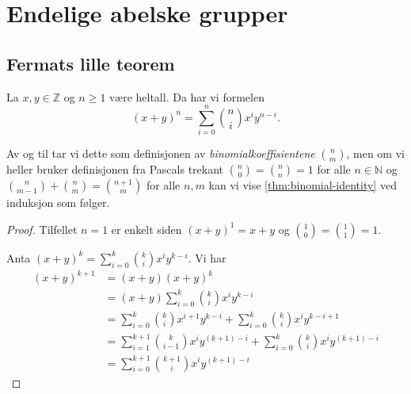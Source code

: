 \section{Endelige abelske grupper}

\subsection{Fermats lille teorem}

\begin{lemma}\label{thm:binomial-identity}
    La $x,y\in \mathbb Z$  og $n \geq 1$ være heltall.
    Da har vi formelen
    \[
        (x + y)^n = \sum_{i = 0}^n \binom n i x^i y^{n - i}.
    \]
\end{lemma}

Av og til tar vi dette som definisjonen av \textit{binomialkoeffisientene}
$\binom n m$,
men om vi heller bruker definisjonen fra Pascals trekant $\binom n 0 = \binom n n = 1$
for alle $n\in\mathbb N$ og $\binom n {m - 1} + \binom n m = \binom {n + 1} m$
for alle $n, m$ kan vi vise \cref{thm:binomial-identity} ved induksjon som følger.
\begin{proof}
    Tilfellet $n = 1$ er enkelt siden
    $(x + y)^1 = x + y$ og $\binom 1 0 = \binom 1 1 = 1$.

    Anta $(x + y)^k = \sum_{i = 0}^k \binom k i x^i y^{k - i}$.
    Vi har
    \[\begin{aligned}
        (x + y)^{k + 1}
        &=  (x + y)(x + y)^k
        \\
        &= (x + y)\sum_{i = 0}^k \binom k i x^i y^{k - i}
        \\
        &= \sum_{i = 0}^k \binom k i x^{i + 1} y^{k - i}
        + \sum_{i = 0}^k \binom k i x^{i} y^{k - i + 1}
        \\
        &= \sum_{i = 1}^{k + 1} \binom k {i - 1} x^{i} y^{(k + 1) - i}
        + \sum_{i = 0}^k \binom k i x^{i} y^{(k + 1) - i}
        \\
        &= \sum_{i = 0}^{k + 1} \binom {k + 1} i x^{i} y^{(k + 1) - i}
    \end{aligned}\]
\end{proof}

